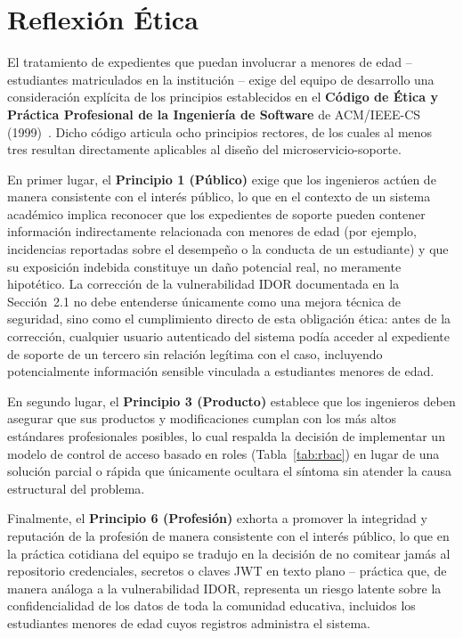 ﻿\documentclass[11pt,a4paper]{article}
\begin{document}
\section{Reflexi\'on \'Etica}
El tratamiento de expedientes que puedan involucrar a menores de edad -- estudiantes matriculados en la instituci\'on -- exige del equipo de desarrollo una consideraci\'on expl\'icita de los principios establecidos en el \textbf{C\'odigo de \'Etica y Pr\'actica Profesional de la Ingenier\'ia de Software} de ACM/IEEE-CS (1999)~\cite{acmieee1999code}. Dicho c\'odigo articula ocho principios rectores, de los cuales al menos tres resultan directamente aplicables al dise\~no del microservicio-soporte.

En primer lugar, el \textbf{Principio 1 (P\'ublico)} exige que los ingenieros act\'uen de manera consistente con el inter\'es p\'ublico, lo que en el contexto de un sistema acad\'emico implica reconocer que los expedientes de soporte pueden contener informaci\'on indirectamente relacionada con menores de edad (por ejemplo, incidencias reportadas sobre el desempe\~no o la conducta de un estudiante) y que su exposici\'on indebida constituye un da\~no potencial real, no meramente hipot\'etico. La correcci\'on de la vulnerabilidad IDOR documentada en la Secci\'on~2.1 no debe entenderse \'unicamente como una mejora t\'ecnica de seguridad, sino como el cumplimiento directo de esta obligaci\'on \'etica: antes de la correcci\'on, cualquier usuario autenticado del sistema pod\'ia acceder al expediente de soporte de un tercero sin relaci\'on leg\'itima con el caso, incluyendo potencialmente informaci\'on sensible vinculada a estudiantes menores de edad.

En segundo lugar, el \textbf{Principio 3 (Producto)} establece que los ingenieros deben asegurar que sus productos y modificaciones cumplan con los m\'as altos est\'andares profesionales posibles, lo cual respalda la decisi\'on de implementar un modelo de control de acceso basado en roles (Tabla~\ref{tab:rbac}) en lugar de una soluci\'on parcial o r\'apida que \'unicamente ocultara el s\'intoma sin atender la causa estructural del problema.

Finalmente, el \textbf{Principio 6 (Profesi\'on)} exhorta a promover la integridad y reputaci\'on de la profesi\'on de manera consistente con el inter\'es p\'ublico, lo que en la pr\'actica cotidiana del equipo se tradujo en la decisi\'on de no comitear jam\'as al repositorio credenciales, secretos o claves JWT en texto plano -- pr\'actica que, de manera an\'aloga a la vulnerabilidad IDOR, representa un riesgo latente sobre la confidencialidad de los datos de toda la comunidad educativa, incluidos los estudiantes menores de edad cuyos registros administra el sistema.
\end{document}
